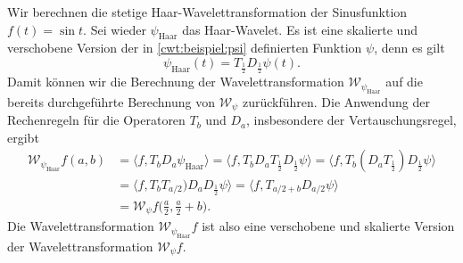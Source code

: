 \begin{beispiel}
Wir berechnen die stetige Haar-Wavelettransformation der Sinusfunktion
$f(t)=\sin t$.
Sei wieder $\psi_{\text{Haar}}$ das Haar-Wavelet.
Es ist eine skalierte und verschobene Version der in
\eqref{cwt:beispiel:psi} definierten Funktion $\psi$, denn es gilt
\[
\psi_{\text{Haar}}(t) = T_{\frac12}D_{\frac12}\psi(t).
\]
Damit können wir die Berechnung der Wavelettransformation
$\mathcal{W}_{\psi_{\text{Haar}}}$ auf die bereits durchgeführte
Berechnung von $\mathcal{W}_{\psi}$ zurückführen.
Die Anwendung der Rechenregeln für die Operatoren $T_b$ und $D_a$,
insbesondere der Vertauschungsregel, ergibt
\begin{align*}
\mathcal{W}_{\psi_{\text{Haar}}}f(a,b)
&=
\langle f, T_bD_a\psi_{\text{Haar}}\rangle
=
\langle f, T_bD_aT_{\frac12}D_{\frac12}\psi\rangle
=
\langle f, T_b(D_aT_{\frac12})D_{\frac12}\psi\rangle
\\
&=
\langle f, T_bT_{a/2})D_aD_{\frac12}\psi\rangle
=
\langle f, T_{a/2+b}D_{a/2}\psi\rangle
\\
&=
\mathcal{W}_{\psi}f\biggl(\frac{a}2,\frac{a}2+b\biggr).
\end{align*}
Die Wavelettransformation $\mathcal{W}_{\psi_{\text{Haar}}}f$ ist also
eine verschobene und skalierte Version der Wavelettransformation 
$\mathcal{W}_{\psi}f$.
\end{beispiel}

